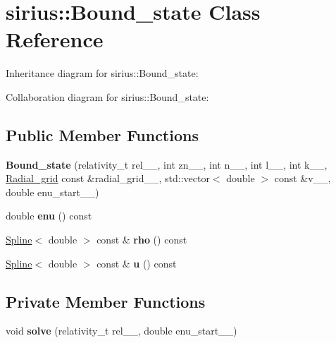 \hypertarget{classsirius_1_1_bound__state}{}\section{sirius\+:\+:Bound\+\_\+state Class Reference}
\label{classsirius_1_1_bound__state}


Inheritance diagram for sirius\+:\+:Bound\+\_\+state\+:


Collaboration diagram for sirius\+:\+:Bound\+\_\+state\+:
\subsection*{Public Member Functions}
\begin{DoxyCompactItemize}
\item 
\hypertarget{classsirius_1_1_bound__state_a9742261ae76db95850bf46a832e11a67}{}{\bfseries Bound\+\_\+state} (relativity\+\_\+t rel\+\_\+\+\_\+, int zn\+\_\+\+\_\+, int n\+\_\+\+\_\+, int l\+\_\+\+\_\+, int k\+\_\+\+\_\+, \hyperlink{classsirius_1_1_radial__grid}{Radial\+\_\+grid} const \&radial\+\_\+grid\+\_\+\+\_\+, std\+::vector$<$ double $>$ const \&v\+\_\+\+\_\+, double enu\+\_\+start\+\_\+\+\_\+)\label{classsirius_1_1_bound__state_a9742261ae76db95850bf46a832e11a67}

\item 
\hypertarget{classsirius_1_1_bound__state_aabf9b3579f0c4d6eac854abfe25bc8e1}{}double {\bfseries enu} () const \label{classsirius_1_1_bound__state_aabf9b3579f0c4d6eac854abfe25bc8e1}

\item 
\hypertarget{classsirius_1_1_bound__state_a31d2f51fda45d42b2d0164aa41dc6ed7}{}\hyperlink{classsirius_1_1_spline}{Spline}$<$ double $>$ const \& {\bfseries rho} () const \label{classsirius_1_1_bound__state_a31d2f51fda45d42b2d0164aa41dc6ed7}

\item 
\hypertarget{classsirius_1_1_bound__state_a643be412c8dd8df41ae8687f25ec08f0}{}\hyperlink{classsirius_1_1_spline}{Spline}$<$ double $>$ const \& {\bfseries u} () const \label{classsirius_1_1_bound__state_a643be412c8dd8df41ae8687f25ec08f0}

\end{DoxyCompactItemize}
\subsection*{Private Member Functions}
\begin{DoxyCompactItemize}
\item 
\hypertarget{classsirius_1_1_bound__state_ab9b34819c7ba09528a67b844f6582a98}{}void {\bfseries solve} (relativity\+\_\+t rel\+\_\+\+\_\+, double enu\+\_\+start\+\_\+\+\_\+)\label{classsirius_1_1_bound__state_ab9b34819c7ba09528a67b844f6582a98}

\end{DoxyCompactItemize}
